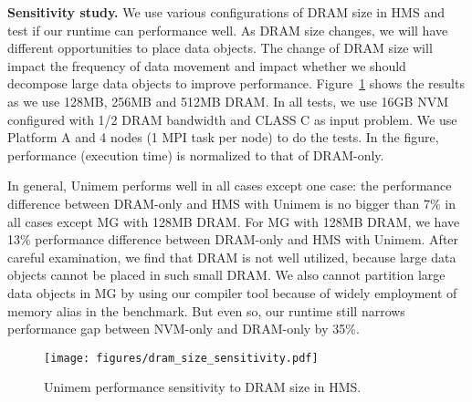 \begin{comment}
\begin{figure}[!t]
    \centering
    \texttt{[image: figures/strong\_scaling\_bt.pdf]}
    \caption{BT strong scaling tests on Edison (LBNL).}
    \label{fig:strong_scaling_bt}
    \vspace{-15pt}
\end{figure}
\end{comment}

\begin{spacing}{0.9}
\textbf{Sensitivity study.}
We use various configurations of DRAM size in HMS and 
test if our runtime can performance well. 
As DRAM size changes, we will have different opportunities 
to place data objects. 
The change of DRAM size will impact the frequency of data movement
and impact whether we should decompose large data objects to improve performance. Figure~\ref{fig:dram_size_sensitivity} shows the results
as we use 128MB, 256MB and 512MB DRAM. In all tests, we use 16GB
NVM configured with 1/2 DRAM bandwidth and CLASS C as input problem. We use Platform A and 4 nodes (1 MPI task per node) to do the tests. In the figure, performance (execution time) is normalized to that of DRAM-only.

In general, Unimem performs well in all cases except one case:
the performance difference between DRAM-only and HMS with Unimem is 
no bigger than 7\% in all cases except MG with 128MB DRAM.
For MG with 128MB DRAM, we have 13\% performance difference between
DRAM-only and HMS with Unimem.
After careful examination, we find that DRAM is not well utilized,
because large data objects cannot be placed in such small DRAM.
We also cannot partition large data objects in MG by using our compiler tool
because of widely employment of memory alias in the benchmark.
But even so, our runtime still narrows performance gap between NVM-only and DRAM-only by 35\%.
\vspace{-5pt}
\end{spacing}

\begin{figure}[!htbp]
    \centering
    \texttt{[image: figures/dram\_size\_sensitivity.pdf]}
    \vspace{-20pt}
    \caption{Unimem performance sensitivity to DRAM size in HMS.}
    \label{fig:dram_size_sensitivity}
    \vspace{-15pt}
\end{figure}








